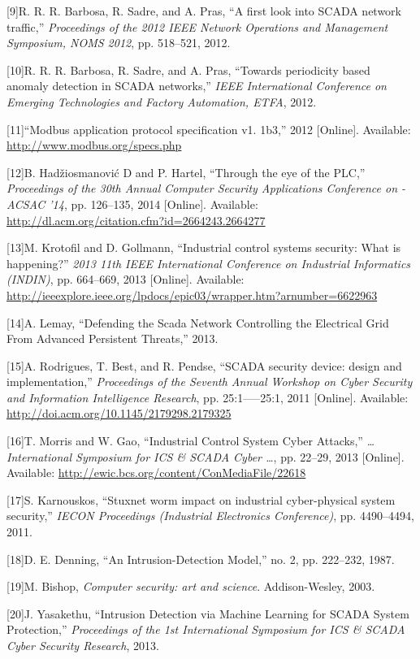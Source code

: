 \documentclass[11pt,]{article}
\begin{document}
{[}9{]}R. R. R. Barbosa, R. Sadre, and A. Pras, ``A first look into
SCADA network traffic,'' \emph{Proceedings of the 2012 IEEE Network
Operations and Management Symposium, NOMS 2012}, pp. 518--521, 2012.

{[}10{]}R. R. R. Barbosa, R. Sadre, and A. Pras, ``Towards periodicity
based anomaly detection in SCADA networks,'' \emph{IEEE International
Conference on Emerging Technologies and Factory Automation, ETFA}, 2012.

{[}11{]}``Modbus application protocol specification v1. 1b3,'' 2012
{[}Online{]}. Available: \url{http://www.modbus.org/specs.php}

{[}12{]}B. Hadžiosmanović D and P. Hartel, ``Through the eye of the
PLC,'' \emph{Proceedings of the 30th Annual Computer Security
Applications Conference on - ACSAC '14}, pp. 126--135, 2014
{[}Online{]}. Available:
\url{http://dl.acm.org/citation.cfm?id=2664243.2664277}

{[}13{]}M. Krotofil and D. Gollmann, ``Industrial control systems
security: What is happening?'' \emph{2013 11th IEEE International
Conference on Industrial Informatics (INDIN)}, pp. 664--669, 2013
{[}Online{]}. Available:
\url{http://ieeexplore.ieee.org/lpdocs/epic03/wrapper.htm?arnumber=6622963}

{[}14{]}A. Lemay, ``Defending the Scada Network Controlling the
Electrical Grid From Advanced Persistent Threats,'' 2013.

{[}15{]}A. Rodrigues, T. Best, and R. Pendse, ``SCADA security device:
design and implementation,'' \emph{Proceedings of the Seventh Annual
Workshop on Cyber Security and Information Intelligence Research}, pp.
25:1-----25:1, 2011 {[}Online{]}. Available:
\url{http://doi.acm.org/10.1145/2179298.2179325}

{[}16{]}T. Morris and W. Gao, ``Industrial Control System Cyber
Attacks,'' \emph{\ldots{}International Symposium for ICS \& SCADA Cyber
\ldots{}}, pp. 22--29, 2013 {[}Online{]}. Available:
\url{http://ewic.bcs.org/content/ConMediaFile/22618}

{[}17{]}S. Karnouskos, ``Stuxnet worm impact on industrial
cyber-physical system security,'' \emph{IECON Proceedings (Industrial
Electronics Conference)}, pp. 4490--4494, 2011.

{[}18{]}D. E. Denning, ``An Intrusion-Detection Model,'' no. 2, pp.
222--232, 1987.

{[}19{]}M. Bishop, \emph{Computer security: art and science}.
Addison-Wesley, 2003.

{[}20{]}J. Yasakethu, ``Intrusion Detection via Machine Learning for
SCADA System Protection,'' \emph{Proceedings of the 1st International
Symposium for ICS \& SCADA Cyber Security Research}, 2013.
\end{document}
